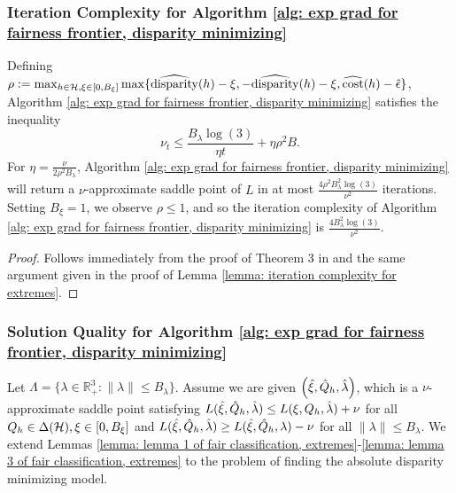 \documentclass{article}
\begin{document}
\subsubsection{Iteration Complexity for Algorithm \ref{alg: exp grad for fairness frontier, disparity minimizing}}

\begin{lemma}\label{lemma: iteration complexity for disparity minimizing}
    Defining $\rho := \max_{h \in \mathcal{H}, \xi \in [0, B_\xi]} \max\{\widehat{\operatorname{disparity}}(h) - \xi, -\widehat{\operatorname{disparity}}(h) - \xi, \widehat{\operatorname{cost}}(h) - \hat{\epsilon}\}$, Algorithm \ref{alg: exp grad for fairness frontier, disparity minimizing} satisfies the inequality
        \[
            \nu_t \leq \frac{ B_\lambda \log(3) }{ \eta t } + \eta \rho^2 B.
        \]
    For $\eta = \frac{\nu}{2 \rho^2 B_\lambda}$, Algorithm \ref{alg: exp grad for fairness frontier, disparity minimizing} will return a $\nu$-approximate saddle point of $L$ in at most $\frac{ 4 \rho^2 B_\lambda^2 \log(3) }{\nu^2}$ iterations. Setting $B_{\xi} = 1$, we observe $\rho \leq 1$, and so the iteration complexity of Algorithm \ref{alg: exp grad for fairness frontier, disparity minimizing} is $\frac{ 4 B_\lambda^2 \log(3) }{\nu^2}$.
    
    \begin{proof}
     Follows immediately from the proof of Theorem 3 in \cite{AgarwalEtAl(19)-FairRegression} and the same argument given in the proof of Lemma \ref{lemma: iteration complexity for extremes}.
    \end{proof}
\end{lemma}

\subsubsection{Solution Quality for Algorithm \ref{alg: exp grad for fairness frontier, disparity minimizing}}

Let $\Lambda = \{\lambda \in \mathbb{R}_{+}^{3} : \|\lambda\| \leq B_\lambda\}$. Assume we are given $\left( \hat{\xi}, \hat{Q}_h, \hat{\lambda} \right)$, which is a $\nu$-approximate saddle point satisfying $L(\hat{\xi}, \hat{Q}_h, \hat{\lambda}) \leq L(\xi, Q_h, \hat{\lambda}) + \nu$ for all $Q_h \in \Delta(\mathcal{H}), \xi \in [0, B_\xi]$ and $L(\hat{\xi}, \hat{Q}_h, \hat{\lambda}) \geq L(\hat{\xi}, \hat{Q}_h, \lambda) - \nu$ for all $\|\lambda\| \leq B_\lambda$. We extend Lemmas \ref{lemma: lemma 1 of fair classification, extremes}-\ref{lemma: lemma 3 of fair classification, extremes} to the problem of finding the absolute disparity minimizing model. 
\end{document}
